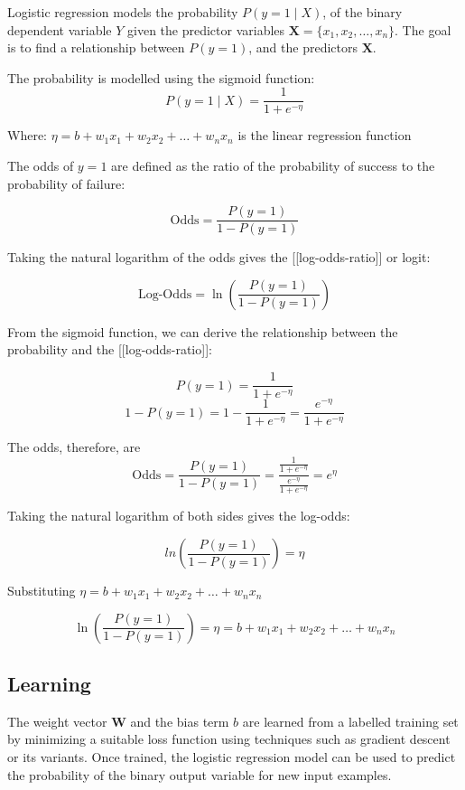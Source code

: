 \documentclass[conference]{IEEEtran}
\begin{document}
	Logistic regression models the probability $P(y = 1 \mid X)$, of the binary dependent variable $Y$ given the predictor variables $\textbf{X} = \{x_1, x_2, \dots, x_n\}$. The goal is to find a relationship between $P(y=1)$, and the predictors $\textbf{X}$.
	
	The probability is modelled using the sigmoid function:
	$$P(y = 1 \mid X) = \frac{1}{1 + e^{-\eta}}$$
	
	Where:
	$\eta = b + w_1 x_1 + w_2 x_2 + \dots + w_n x_n$  is the linear regression function
	
	The odds of $y=1$ are defined as the ratio of the probability of success to the probability of failure:
	
	$$\text{Odds} = \frac{P(y = 1)}{1 - P(y = 1)}$$
	
	Taking the natural logarithm of the odds gives the [[log-odds-ratio]] or logit:
	
	$$\text{Log-Odds} = \ln\left(\frac{P(y = 1)}{1 - P(y = 1)}\right)$$
	
	From the sigmoid function, we can derive the relationship between the probability and the [[log-odds-ratio]]:
	
	$$P(y = 1) = \frac{1}{1 + e^{-\eta}}$$
	$$1 - P(y = 1) = 1 - \frac{1}{1 + e^{-\eta}} = \frac{e^{-\eta}}{1 + e^{-\eta}}$$
	
	The odds, therefore, are
	$$\text{Odds} = \frac{P(y = 1)}{1 - P(y = 1)} = \frac{\frac{1}{1 + e^{-\eta}}}{\frac{e^{-\eta}}{1 + e^{-\eta}}} = e^{\eta}$$
	
	
	Taking the natural logarithm of both sides gives the log-odds:
	
	$$ln\left(\frac{P(y = 1)}{1 - P(y = 1)}\right) = \eta$$
	
	Substituting $\eta = b + w_1 x_1 + w_2 x_2 + \dots + w_n x_n$
	
	\begin{equation}
		\ln\left(\frac{P(y = 1)}{1 - P(y = 1)}\right) = \eta = b + w_1 x_1 + w_2 x_2 + \dots + w_n x_n
	\end{equation}
	
	
	\subsection{Learning}
	
	The weight vector $\textbf{W}$ and the bias term $b$ are learned from a labelled training set by minimizing a suitable loss function using techniques such as gradient descent or its variants. Once trained, the logistic regression model can be used to predict the probability of the binary output variable for new input examples.
	
\end{document}
